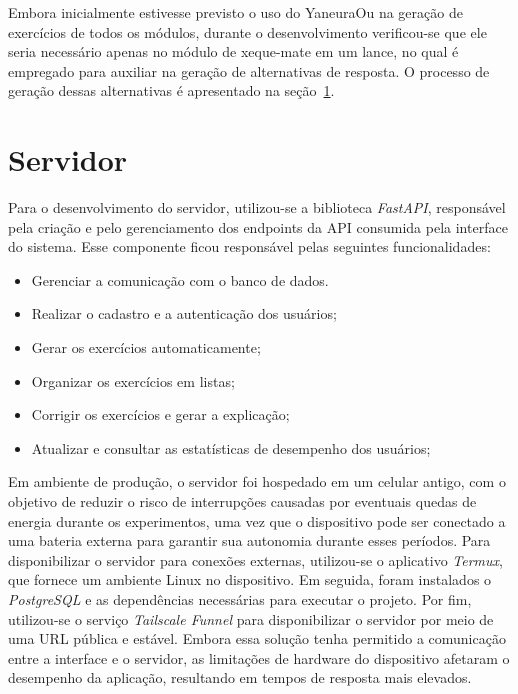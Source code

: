     Embora inicialmente estivesse previsto o uso do YaneuraOu na geração de exercícios de todos os módulos, durante o desenvolvimento verificou-se que ele seria necessário apenas no módulo de xeque-mate em um lance, no qual é empregado para auxiliar na geração de alternativas de resposta. O processo de geração dessas alternativas é apresentado na seção~\ref{sec:server}.
    
    \section{Servidor}
    \label{sec:server}
    Para o desenvolvimento do servidor, utilizou-se a biblioteca \textit{FastAPI}, responsável pela criação e pelo gerenciamento dos endpoints da API consumida pela interface do sistema. Esse componente ficou responsável pelas seguintes funcionalidades:
    
    \begin{itemize}
    \item Gerenciar a comunicação com o banco de dados.
    \item Realizar o cadastro e a autenticação dos usuários;
    \item Gerar os exercícios automaticamente;
    \item Organizar os exercícios em listas;
    \item Corrigir os exercícios e gerar a explicação;
    \item Atualizar e consultar as estatísticas de desempenho dos usuários;
    \end{itemize}
    
    Em ambiente de produção, o servidor foi hospedado em um celular antigo, com o objetivo de reduzir o risco de interrupções causadas por eventuais quedas de energia durante os experimentos, uma vez que o dispositivo pode ser conectado a uma bateria externa para garantir sua autonomia durante esses períodos. Para disponibilizar o servidor para conexões externas, utilizou-se o aplicativo \textit{Termux}, que fornece um ambiente Linux no dispositivo. Em seguida, foram instalados o \textit{PostgreSQL} e as dependências necessárias para executar o projeto. Por fim, utilizou-se o serviço \textit{Tailscale Funnel} para disponibilizar o servidor por meio de uma URL pública e estável. Embora essa solução tenha permitido a comunicação entre a interface e o servidor, as limitações de hardware do dispositivo afetaram o desempenho da aplicação, resultando em tempos de resposta mais elevados.
    
